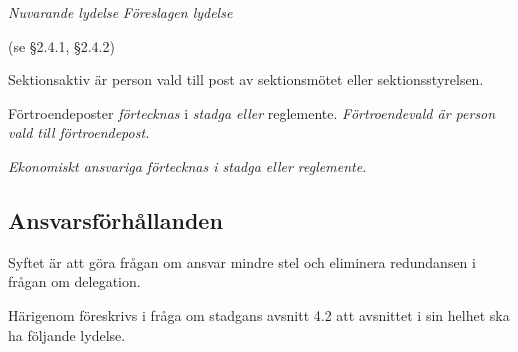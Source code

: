 \documentclass{article}
\newenvironment{lydelse}
    {\begin{paracol}{2}%
        \emph{Nuvarande lydelse}%
        \switchcolumn%
        \emph{Föreslagen lydelse}%
    \end{paracol}%
    \begin{enumerate}[label=\thesubsection.\arabic*]%
    \begin{paracol}{2}%
    }{\end{paracol}\end{enumerate}}
\begin{document}
\begin{lydelse}
  \switchcolumn*
      (se \S 2.4.1, \S 2.4.2)
      
  \switchcolumn
    \item Sektionsaktiv är person vald till post av sektionsmötet eller sektionsstyrelsen.
      \label{4.x:aktiv}
      
    \item Förtroendeposter \emph{förtecknas} i \emph{stadga eller} reglemente.
      \emph{Förtroendevald är person vald till förtroendepost.}
      \label{4.x:fortroende}

    \item \emph{Ekonomiskt ansvariga förtecknas i stadga eller reglemente.}

\end{lydelse}

\subsection{Ansvarsförhållanden} \label{4.2:ansvar}
Syftet är att göra frågan om ansvar mindre stel och eliminera redundansen i frågan om delegation.

Härigenom föreskrivs i fråga om stadgans avsnitt 4.2 att avsnittet i sin helhet ska ha följande lydelse.
\end{document}

